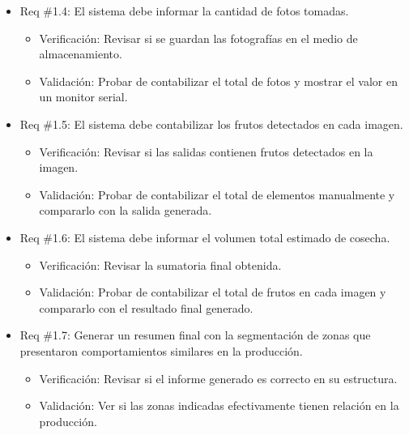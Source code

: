 \documentclass[
11pt, %
]{charter}
\begin{document}
\begin{itemize} 
\item Req \#1.4: El sistema debe informar la cantidad de fotos tomadas.
\begin{itemize}
	\item Verificación: Revisar si se guardan las fotografías en el medio de almacenamiento.
	\item Validación: Probar de contabilizar el total de fotos y mostrar el valor en un monitor serial.
\end{itemize}
\end{itemize}

\begin{itemize} 
\item Req \#1.5: El sistema debe contabilizar los frutos detectados en cada imagen.
\begin{itemize}
	\item Verificación: Revisar si las salidas contienen frutos detectados en la imagen.
	\item Validación: Probar de contabilizar el total de elementos manualmente y compararlo con la salida generada.
\end{itemize}
\end{itemize}

\begin{itemize} 
\item Req \#1.6: El sistema debe informar el volumen total estimado de cosecha.
\begin{itemize}
	\item Verificación: Revisar la sumatoria final obtenida.
	\item Validación: Probar de contabilizar el total de frutos en cada imagen y compararlo con el resultado final generado.
\end{itemize}
\end{itemize}

\begin{itemize} 
\item Req \#1.7: Generar un resumen final con la segmentación de zonas que presentaron comportamientos similares en la producción.
\begin{itemize}
	\item Verificación: Revisar si el informe generado es correcto en su estructura.
	\item Validación: Ver si las zonas indicadas efectivamente tienen relación en la producción.
\end{itemize}
\end{itemize}
\end{document}
